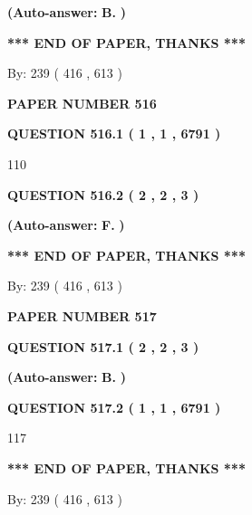 \documentclass[12pt]{article}
\begin{document}
 
{\textbf{(Auto-answer:}}
{\textbf{\large{
B.}}}
{\textbf{)}}
 
 
   
   
   
   
\vspace{1.0in} 
{\textbf{\large{ *** END OF PAPER, THANKS *** }}} 
   
   
\hspace{1.0in} By: 
 239 ( 416 ,  613 )
   
   
   
   
\newpage 
\setcounter{page}{ 
   516001 } 
   
   
 {\textbf{ \Large{ PAPER NUMBER  516  }}}
   
   
   
   
  
  
{\textbf{\large{QUESTION
516.1 
 ( 1 , 1 , 6791 )
}}}

110
  
  
{\textbf{\large{QUESTION
516.2 
 ( 2 , 2 , 3 )
}}}
 
 
{\textbf{(Auto-answer:}}
{\textbf{\large{
F.}}}
{\textbf{)}}
 
 
   
   
   
   
\vspace{1.0in} 
{\textbf{\large{ *** END OF PAPER, THANKS *** }}} 
   
   
\hspace{1.0in} By: 
 239 ( 416 ,  613 )
   
   
   
   
\newpage 
\setcounter{page}{ 
   517001 } 
   
   
 {\textbf{ \Large{ PAPER NUMBER  517  }}}
   
   
   
   
  
  
{\textbf{\large{QUESTION
517.1 
 ( 2 , 2 , 3 )
}}}
 
 
{\textbf{(Auto-answer:}}
{\textbf{\large{
B.}}}
{\textbf{)}}
 
 
  
  
{\textbf{\large{QUESTION
517.2 
 ( 1 , 1 , 6791 )
}}}

117
   
   
   
   
\vspace{1.0in} 
{\textbf{\large{ *** END OF PAPER, THANKS *** }}} 
   
   
\hspace{1.0in} By: 
 239 ( 416 ,  613 )
   
   
   
\end{document}

